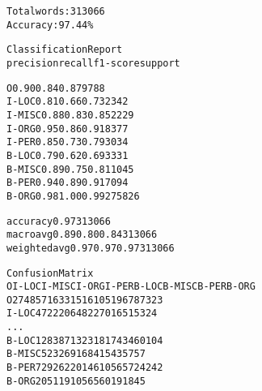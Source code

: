 \begin{alltt}
Total words: 313066
Accuracy: 97.44\%

Classification Report
              precision    recall  f1-score   support

           O       0.90      0.84      0.87      9788
       I-LOC       0.81      0.66      0.73      2342
      I-MISC       0.88      0.83      0.85      2229
       I-ORG       0.95      0.86      0.91      8377
       I-PER       0.85      0.73      0.79      3034
       B-LOC       0.79      0.62      0.69      3331
      B-MISC       0.89      0.75      0.81      1045
       B-PER       0.94      0.89      0.91      7094
       B-ORG       0.98      1.00      0.99    275826

    accuracy                           0.97    313066
   macro avg       0.89      0.80      0.84    313066
weighted avg       0.97      0.97      0.97    313066


Confusion Matrix
             O  I-LOC  I-MISC  I-ORG  I-PER  B-LOC  B-MISC  B-PER  B-ORG
O       274857    163     315     16    105    196      78     73     23
I-LOC      472   2206      48     22     70    165      15     32      4
...
B-LOC     1283     87      13      2     31   8174      34     60    104
B-MISC     523      2      69      1      6     84    1543     57     57
B-PER      729     26      22      0    146    105      65   7242     42
B-ORG      205      1      19     10      5     65      60     19   1845
\end{alltt}